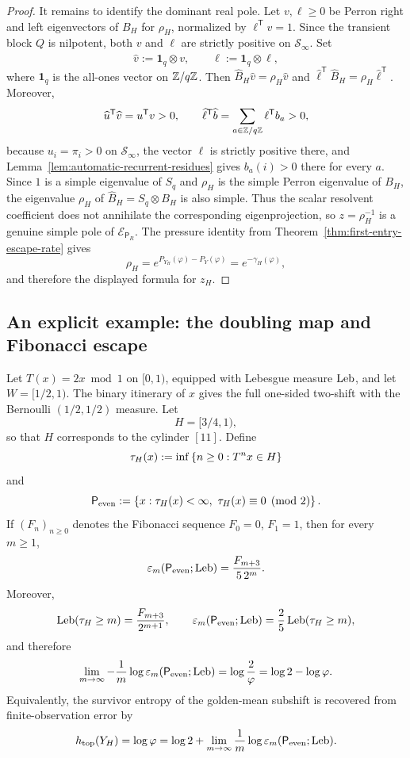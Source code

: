 \begin{proof}
It remains to identify the dominant real pole.  Let \(v,\ell\geq 0\) be
Perron right and left eigenvectors of \(B_H\) for \(\rho_H\), normalized
by \(\ell^{\mathsf T}v=1\).  Since the transient block \(Q\) is
nilpotent, both \(v\) and \(\ell\) are strictly positive on
\(\mathcal S_\infty\).  Set
\[
  \widehat v:=\mathbf{1}_q\otimes v,
  \qquad
  \widehat\ell:=\mathbf{1}_q\otimes \ell,
\]
where \(\mathbf{1}_q\) is the all-ones vector on \(\mathbb{Z}/q\mathbb{Z}\).  Then
\(\widehat B_H\widehat v=\rho_H\widehat v\) and
\(\widehat\ell^{\mathsf T}\widehat B_H=\rho_H\widehat\ell^{\mathsf T}\).
Moreover,
\[
  \widehat u^{\mathsf T}\widehat v=u^{\mathsf T}v>0,
  \qquad
  \widehat\ell^{\mathsf T}\widehat b
  = \sum_{a\in\mathbb{Z}/q\mathbb{Z}}\ell^{\mathsf T}b_a>0,
\]
because \(u_i=\pi_i>0\) on \(\mathcal S_\infty\), the vector \(\ell\)
is strictly positive there, and
Lemma~\ref{lem:automatic-recurrent-residues} gives \(b_a(i)>0\) there
for every \(a\).  Since \(1\) is a simple eigenvalue of \(S_q\) and
\(\rho_H\) is the simple Perron eigenvalue of \(B_H\), the eigenvalue
\(\rho_H\) of \(\widehat B_H=S_q\otimes B_H\) is also simple.  Thus the
scalar resolvent coefficient does not annihilate the corresponding
eigenprojection, so \(z=\rho_H^{-1}\) is a genuine simple pole of
\(\mathcal E_{\mathsf{P}_R}\).  The pressure identity from
Theorem~\ref{thm:first-entry-escape-rate} gives
\[
  \rho_H=e^{P_{Y_H}(\varphi)-P_Y(\varphi)}
  =e^{-\gamma_H(\varphi)},
\]
and therefore the displayed formula for \(z_H\).
\end{proof}

\subsection{An explicit example: the doubling map and Fibonacci escape}

\begin{proposition}
\label{prop:doubling-fibonacci-escape}
Let \(T(x)=2x\bmod 1\) on \([0,1)\), equipped with Lebesgue measure
\(\mathrm{Leb}\), and let \(W=[1/2,1)\).  The binary itinerary of \(x\) gives
the full one-sided two-shift with the Bernoulli \((1/2,1/2)\) measure.
Let
\[
  H=[3/4,1),
\]
so that \(H\) corresponds to the cylinder \([11]\).  Define
\[
  \tau_H(x):=\inf\left\{n\geq 0:T^n x\in H\right\}
\]
and
\[
  \mathsf{P}_{\mathrm{even}}
  := \left\{x:\tau_H(x)<\infty,\ \tau_H(x)\equiv 0 \pmod 2\right\}.
\]
If \((F_n)_{n\geq 0}\) denotes the Fibonacci sequence
\(F_0=0\), \(F_1=1\), then for every \(m\geq 1\),
\[
  \varepsilon_m(\mathsf{P}_{\mathrm{even}};\mathrm{Leb})
  = \frac{F_{m+3}}{5\,2^m}.
\]
Moreover,
\[
  \mathrm{Leb}(\tau_H\geq m)=\frac{F_{m+3}}{2^{m+1}},
  \qquad
  \varepsilon_m(\mathsf{P}_{\mathrm{even}};\mathrm{Leb})
  = \frac25\,\mathrm{Leb}(\tau_H\geq m),
\]
and therefore
\[
  \lim_{m\to\infty}
  -\frac1m\log\varepsilon_m(\mathsf{P}_{\mathrm{even}};\mathrm{Leb})
  = \log\frac{2}{\varphi}
  = \log 2-\log\varphi.
\]
Equivalently, the survivor entropy of the golden-mean subshift is
recovered from finite-observation error by
\[
  h_{\mathrm{top}}(Y_H)
  = \log\varphi
  = \log 2
    + \lim_{m\to\infty}\frac1m
      \log \varepsilon_m(\mathsf{P}_{\mathrm{even}};\mathrm{Leb}).
\]
\end{proposition}

